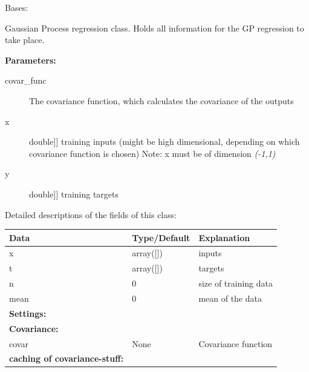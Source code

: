 \documentclass[letterpaper,10pt,english]{sphinxmanual}
\begin{document}
\begin{fulllineitems}
\label{gp:pygp.gp.gp_base.GP}
Bases: 

Gaussian Process regression class. Holds all information
for the GP regression to take place.

\textbf{Parameters:}
\begin{description}
\item[{covar\_func}] 
The covariance function, which calculates the covariance
of the outputs

\item[{x}] \leavevmode{[}{[}double{]}{]}
training inputs (might be high dimensional,
depending on which covariance function is chosen)
Note: x must be of dimension \emph{(-1,1)}

\item[{y}] \leavevmode{[}{[}double{]}{]}
training targets

\end{description}

Detailed descriptions of the fields of this class:

\begin{tabulary}{\linewidth}{|L|L|L|}
\hline
\textbf{
Data
} & \textbf{
Type/Default
} & \textbf{
Explanation
}\\\hline

x
 & 
array({[}{]})
 & 
inputs
\\\hline

t
 & 
array({[}{]})
 & 
targets
\\\hline

n
 & 
0
 & 
size of training data
\\\hline

mean
 & 
0
 & 
mean of the data
\\\hline

\textbf{Settings:}
 &  & \\\hline

\textbf{Covariance:}
 &  & \\\hline

covar
 & 
None
 & 
Covariance function
\\\hline

\textbf{caching of covariance-stuff:}
 &  & \\\hline


\end{tabulary}
\end{fulllineitems}
\end{document}
